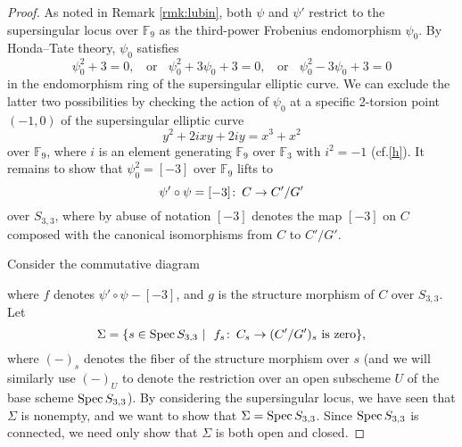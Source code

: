 \documentclass{gtpart}
\theoremstyle{definition}
\theoremstyle{remark}
\def\co{\colon\thinspace}
\newcommand{\mb}[1]{\mathbb{#1}}
\newcommand{\Spec}{{\rm Spec\thinspace}}
\newcommand{\BF}{{\mb F}}
\newcommand{\s}{S_{3,3}}
\begin{document}
\begin{proof}
 As noted in Remark \ref{rmk:lubin}, both $\psi$ and $\psi'$ restrict to the supersingular locus over $\BF_9$ as the third-power Frobenius endomorphism $\psi_0$.  
 By Honda--Tate theory, $\psi_0$ satisfies 
 \[
  \psi_0^2 + 3 = 0,~~~~\text{or}~~~~\psi_0^2 + 3 \psi_0 + 3 = 0,~~~~\text{or}~~~~\psi_0^2 - 3 \psi_0 + 3 = 0 
 \]
 in the endomorphism ring of the supersingular elliptic curve.  
 We can exclude the latter two possibilities by checking the action of $\psi_0$ at a specific 2-torsion point $(-1,0)$ of the supersingular elliptic curve 
 \[
  y^2 + 2 i x y + 2 i y = x^3 + x^2 
 \]
 over $\BF_9$, where $i$ is an element generating $\BF_9$ over $\BF_3$ with $i^2 = -1$ (cf.\thinspace\eqref{h}).  
 It remains to show that $\psi_0^2 = [-3]$ over $\BF_9$ lifts to 
 \[
  \psi' \circ \psi = [-3] \co C \to C'/G' 
 \]
 over $\s$, where by abuse of notation $[-3]$ denotes the map $[-3]$ on $C$ composed with the canonical isomorphisms from $C$ to $C'/G'$.  
 
 Consider the commutative diagram 
 \begin{center}
 \end{center}
 where $f$ denotes $\psi' \circ \psi - [-3]$, and $g$ is the structure morphism of $C$ over $\s$.  Let 
 \[
  \Sigma = \{ s \in \Spec \s~|~~f_s \co C_s \to (C'/G')_s ~\text{is zero} \}, 
 \]
 where $(-)_s$ denotes the fiber of the structure morphism over $s$ 
 (and we will similarly use $(-)_U$ to denote the restriction over an open subscheme $U$ of the base scheme $\Spec \s$).  
 By considering the supersingular locus, we have seen that $\Sigma$ is nonempty, and we want to show that $\Sigma = \Spec \s$.  
 Since $\Spec \s$ is connected, we need only show that $\Sigma$ is both open and closed.  


\end{proof}
\end{document}
